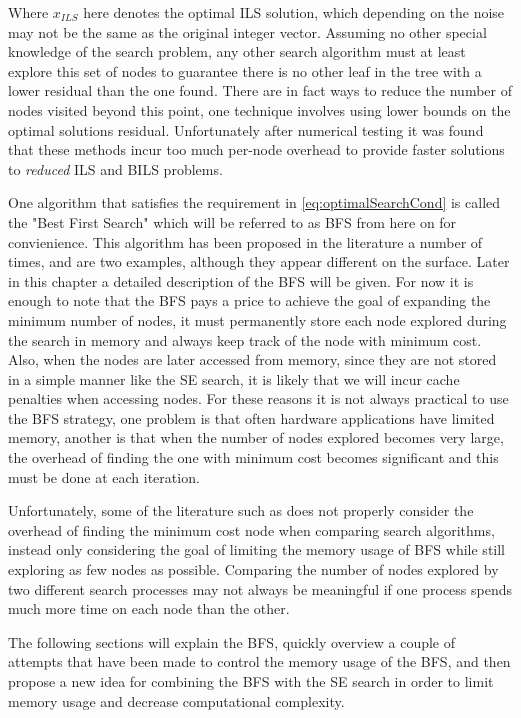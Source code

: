 \documentclass[12pt,Bold,letterpaper]{mcgilletdclass}
\begin{document}
Where $x_{ILS}$ here denotes the optimal ILS solution, which depending on the noise may not be the same as the original integer vector. Assuming no other special knowledge of the search problem, any other search algorithm must at least explore this set of nodes to guarantee there is no other leaf in the tree with a lower residual than the one found. There are in fact ways to reduce the number of nodes visited beyond this point, one technique involves using lower bounds on the optimal solutions residual. Unfortunately after numerical testing it was found that these methods incur too much per-node overhead to provide faster solutions to {\em reduced} ILS and BILS problems.

One algorithm that satisfies the requirement in \eqref{eq:optimalSearchCond} is called the "Best First Search" which will be referred to as BFS from here on for convienience. This algorithm has been proposed in the literature a number of times, \cite{FukMU04} and \cite{XuWZW04} are two examples, although they appear different on the surface. Later in this chapter a detailed description of the BFS will be given. For now it is enough to note that the BFS pays a price to achieve the goal of expanding the minimum number of nodes, it must permanently store each node explored during the search in memory and always keep track of the node with minimum cost. Also, when the nodes are later accessed from memory, since they are not stored in a simple manner like the SE search, it is likely that we will incur cache penalties when accessing nodes. For these reasons it is not always practical to use the BFS strategy, one problem is that often hardware applications have limited memory, another is that when the number of nodes explored becomes very large, the overhead of finding the one with minimum cost becomes significant and this must be done at each iteration.

Unfortunately, some of the literature such as \cite{StuBF07} does not properly consider the overhead of finding the minimum cost node when comparing search algorithms, instead only considering the goal of limiting the memory usage of BFS while still exploring as few nodes as possible. Comparing the number of nodes explored by two different search processes may not always be meaningful if one process spends much more time on each node than the other.

The following sections will explain the BFS, quickly overview a couple of attempts that have been made to control the memory usage of the BFS, and then propose a new idea for combining the BFS with the SE search in order to limit memory usage and decrease computational complexity.
\end{document}
